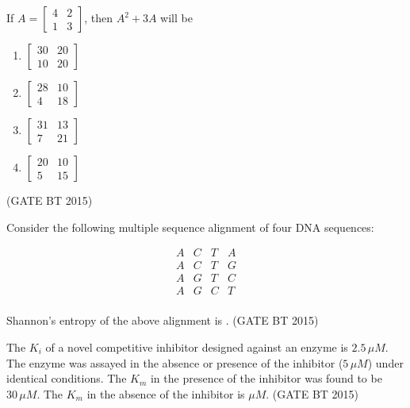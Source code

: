 \item If $A = \begin{bmatrix} 4 & 2 \\ 1 & 3 \end{bmatrix}$, then $A^{2} + 3A$ will be  

\begin{multicols}{2}
\begin{enumerate}
    \item $\begin{bmatrix} 30 & 20 \\ 10 & 20 \end{bmatrix}$  
    \item $\begin{bmatrix} 28 & 10 \\ 4 & 18 \end{bmatrix}$  
    \item $\begin{bmatrix} 31 & 13 \\ 7 & 21 \end{bmatrix}$  
    \item $\begin{bmatrix} 20 & 10 \\ 5 & 15 \end{bmatrix}$  
\end{enumerate}
\end{multicols}\hfill (GATE BT 2015)


\item Consider the following multiple sequence alignment of four DNA sequences:  

\[
\begin{array}{cccc}
A & C & T & A \\
A & C & T & G \\
A & G & T & C \\
A & G & C & T \\
\end{array}
\]

Shannon’s entropy of the above alignment is \underline{\hspace{2cm}}.
\hfill (GATE BT 2015)



\item The $K_i$ of a novel competitive inhibitor designed against an enzyme is  $2.5 \, \mu M$. The enzyme was assayed in the absence or presence of the inhibitor ($5 \, \mu M$) under identical conditions. The $K_m$ in the presence of the inhibitor was found to be $30 \, \mu M$. The $K_m$ in the absence of the inhibitor is \underline{\hspace{2cm}} $\mu M$. 
\hfill (GATE BT 2015)



